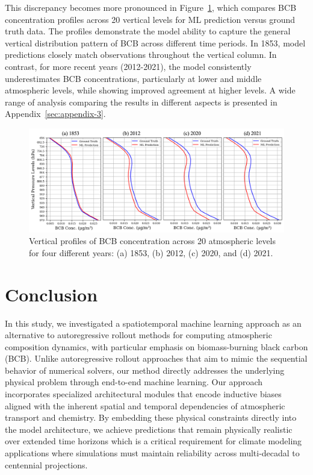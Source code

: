 \documentclass{article}
\begin{document}
    This discrepancy becomes more pronounced in Figure~\ref{fig:vertical_profile}, which compares BCB concentration profiles across 20 vertical levels for ML prediction versus ground truth data.
    The profiles demonstrate the model ability to capture the general vertical distribution pattern of BCB across different time periods. In 1853, model predictions closely match observations throughout the vertical column. In contrast, for more recent years (2012-2021), the model consistently underestimates BCB concentrations, particularly at lower and middle atmospheric levels, while showing improved agreement at higher levels. A wide range of analysis comparing the results in different aspects is presented in Appendix~\ref{sec:appendix-3}.
        
    \begin{figure}[htbp]
        \centering
        \includegraphics[width=1\linewidth]{conc_profile-p.png}
        \caption{Vertical profiles of BCB concentration across 20 atmospheric levels for four different years: (a) 1853, (b) 2012, (c) 2020, and (d) 2021.}
        \label{fig:vertical_profile}
    \end{figure}

\section{Conclusion}
    In this study, we investigated a spatiotemporal machine learning approach as an alternative to autoregressive rollout methods for computing atmospheric composition dynamics, with particular emphasis on biomass-burning black carbon (BCB). Unlike autoregressive rollout approaches that aim to mimic the sequential behavior of numerical solvers, our method directly addresses the underlying physical problem through end-to-end machine learning.
    Our approach incorporates specialized architectural modules that encode inductive biases aligned with the inherent spatial and temporal dependencies of atmospheric transport and chemistry. By embedding these physical constraints directly into the model architecture, we achieve predictions that remain physically realistic over extended time horizons which is a critical requirement for climate modeling applications where simulations must maintain reliability across multi-decadal to centennial projections.
    
\end{document}
